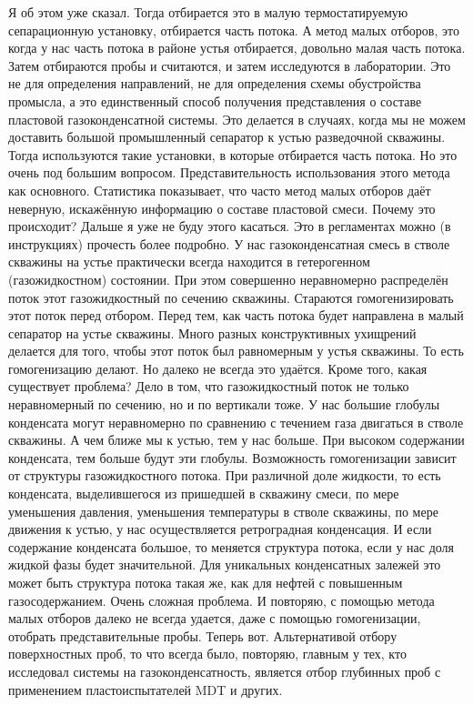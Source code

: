 \documentclass[main.tex]{subfiles}
\begin{document}
Я об этом уже сказал.
Тогда отбирается это в малую термостатируемую сепарационную установку, отбирается часть потока.
А метод малых отборов, это когда у нас часть потока в районе устья отбирается, довольно малая часть потока.
Затем отбираются пробы и считаются, и затем исследуются в лаборатории.
Это не для определения направлений, не для определения схемы обустройства промысла, а это единственный способ получения представления о составе пластовой газоконденсатной системы.
Это делается в случаях, когда мы не можем доставить большой промышленный сепаратор к устью разведочной скважины.
Тогда используются такие установки, в которые отбирается часть потока.
Но это очень под большим вопросом.
Представительность использования этого метода как основного.
Статистика показывает, что часто метод малых отборов даёт неверную, искажённую информацию о составе пластовой смеси.
Почему это происходит?
Дальше я уже не буду этого касаться.
Это в регламентах можно (в инструкциях) прочесть более подробно.
У нас газоконденсатная смесь в стволе скважины на устье практически всегда находится в гетерогенном (газожидкостном) состоянии.
При этом совершенно неравномерно распределён поток этот газожидкостный по сечению скважины.
Стараются гомогенизировать этот поток перед отбором.
Перед тем, как часть потока будет направлена в малый сепаратор на устье скважины.
Много разных конструктивных ухищрений делается для того, чтобы этот поток был равномерным у устья скважины.
То есть гомогенизацию делают.
Но далеко не всегда это удаётся.
Кроме того, какая существует проблема?
Дело в том, что газожидкостный поток не только неравномерный по сечению, но и по вертикали тоже.
У нас большие глобулы конденсата могут неравномерно по сравнению с течением газа двигаться в стволе скважины.
А чем ближе мы к устью, тем у нас больше.
При высоком содержании конденсата, тем больше будут эти глобулы.
Возможность гомогенизации зависит от структуры газожидкостного потока.
При различной доле жидкости, то есть конденсата, выделившегося из пришедшей в скважину смеси, по мере уменьшения давления, уменьшения температуры в стволе скважины, по мере движения к устью, у нас осуществляется ретроградная конденсация.
И если содержание конденсата большое, то меняется структура потока, если у нас доля жидкой фазы будет значительной.
Для уникальных конденсатных залежей это может быть структура потока такая же, как для нефтей с повышенным газосодержанием.
Очень сложная проблема.
И повторяю, с помощью метода малых отборов далеко не всегда удается, даже с помощью гомогенизации, отобрать представительные пробы.
Теперь вот.
Альтернативой отбору поверхностных проб, то что всегда было, повторяю, главным у тех, кто исследовал системы на газоконденсатность, является отбор глубинных проб с применением пластоиспытателей MDT и других.
\end{document}
